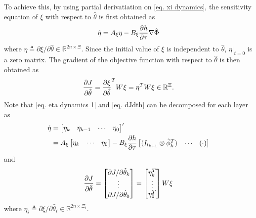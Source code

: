 \documentclass[lettersize,journal]{IEEEtran}
\begin{document}
To achieve this, by using partial derivatiation on \eqref{eq. xi dynamics}, the sensitivity equation of $\xi$ with respect to $\hat\theta$ is first obtained as
\begin{equation}
    \dot\eta = A_\xi\eta - B_\xi{\partial h\over\partial \tau}\nabla\hat\Phi
    \label{eq. eta dynamics 1}
\end{equation}
where $\eta \triangleq \partial \xi/\partial \hat\theta\in\mathbb R^{2n\times \Xi}$.
Since the initial value of $\xi$ is independent to $\hat\theta$, $\eta|_{t=0}$ is a zero matrix. The gradient of the objective function with respect to $\hat\theta$ is then obtained as 
\begin{equation}
   {\partial J\over\partial \hat\theta} =  {\partial \xi\over \partial \hat\theta}^T  W\xi=\eta^T  W\xi\in\mathbb{R}^\Xi.
   \label{eq. dJdth}
\end{equation}
Note that \eqref{eq. eta dynamics 1} and \eqref{eq. dJdth} can be decomposed for each layer as 
\begin{equation}
    \begin{aligned}
        \dot \eta&= 
        \begin{bmatrix}
            \eta_k&
            \eta_{k-1}&
            \cdots &
            \eta_0
        \end{bmatrix}'
        \\
        &=A_\xi
        \begin{bmatrix}
            \eta_k&
            \cdots &
            \eta_0
        \end{bmatrix}
        -B_\xi{\partial h\over\partial \tau}
        \begin{bmatrix}
            (I_{l_{k+1}}\otimes \hat\phi_{k}^T  )&
        \cdots&
        (\cdot)
        \end{bmatrix}
    \end{aligned}
    \label{eq. eta dynamics}
\end{equation}
and
\begin{equation*}\label{eq. grad_J}
    {\partial J\over\partial\hat\theta}
    =
    \begin{bmatrix}
        \partial J/\partial\hat\theta_k\\\vdots\\\partial J/\partial\hat\theta_0\\
    \end{bmatrix}    =
    \begin{bmatrix}
        \eta_k^T\\\vdots\\\eta_0^T\\
    \end{bmatrix}
    W
    \xi
\end{equation*}
where $\eta_i \triangleq \partial \xi/\partial \hat\theta_i\in\mathbb R^{2n\times \Xi_i}$. 
\end{document}
